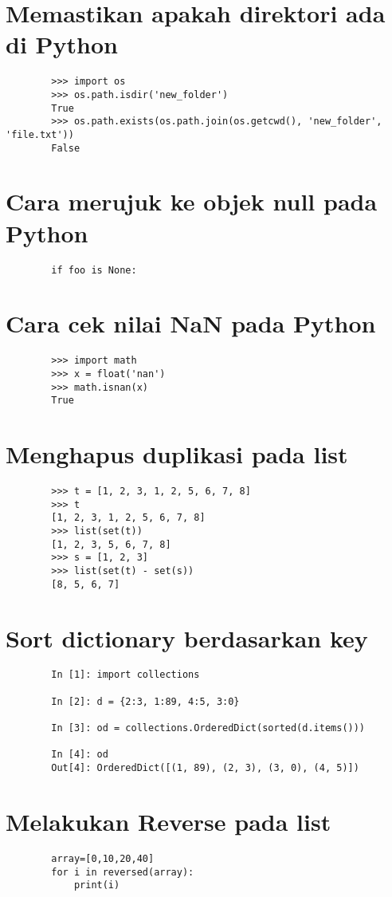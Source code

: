 \documentclass{article}
\begin{document}
	\section {Memastikan apakah direktori ada di Python}
	\begin{lstlisting}
		>>> import os
		>>> os.path.isdir('new_folder')
		True
		>>> os.path.exists(os.path.join(os.getcwd(), 'new_folder', 'file.txt'))
		False
	\end{lstlisting}

	\section {Cara merujuk ke objek null pada Python}
	\begin{lstlisting}
		if foo is None:
	\end{lstlisting}

	\section {Cara cek nilai NaN pada Python}
	\begin{lstlisting}
		>>> import math
		>>> x = float('nan')
		>>> math.isnan(x)
		True
	\end{lstlisting}

	\section {Menghapus duplikasi pada list}
	\begin{lstlisting}
		>>> t = [1, 2, 3, 1, 2, 5, 6, 7, 8]
		>>> t
		[1, 2, 3, 1, 2, 5, 6, 7, 8]
		>>> list(set(t))
		[1, 2, 3, 5, 6, 7, 8]
		>>> s = [1, 2, 3]
		>>> list(set(t) - set(s))
		[8, 5, 6, 7]
	\end{lstlisting}

	\section {Sort dictionary berdasarkan key}
	\begin{lstlisting}
		In [1]: import collections
		
		In [2]: d = {2:3, 1:89, 4:5, 3:0}
		
		In [3]: od = collections.OrderedDict(sorted(d.items()))
		
		In [4]: od
		Out[4]: OrderedDict([(1, 89), (2, 3), (3, 0), (4, 5)])
	\end{lstlisting}

	\section {Melakukan Reverse pada list}
	\begin{lstlisting}
		array=[0,10,20,40]
		for i in reversed(array):
		    print(i)
	\end{lstlisting}
\end{document}
